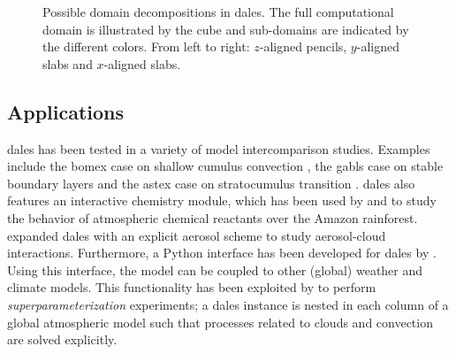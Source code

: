 \begin{figure}[H]
    \centering
    
    \caption{Possible domain decompositions in \acrshort{dales}. The full computational domain is illustrated by the cube and sub-domains are indicated by the different colors. From left to right: $z$-aligned pencils, $y$-aligned slabs and $x$-aligned slabs.}
    \label{fig:dales_domain_decomposition}
\end{figure}

\newpage

\subsection{Applications}
\acrshort{dales} has been tested in a variety of model intercomparison studies. Examples include the \acrshort{bomex} case on shallow cumulus convection \citep{siebesmaLargeEddySimulation2003}, the \acrshort{gabls} case on stable boundary layers \citep{beareIntercomparisonLargeEddySimulations2006} and the \acrshort{astex} case on stratocumulus transition \citep{vanderdussenGASSEUCLIPSEModel2013}. \acrshort{dales} also features an interactive chemistry module, which has been used by \citet{vila-gueraudearellanoRoleBoundaryLayer2011} and \citet{ouwerslootQuantifyingTransportSubcloud2013} to study the behavior of atmospheric chemical reactants over the Amazon rainforest. \citet{debruineExplicitAerosolCloud2019} expanded \acrshort{dales} with an explicit aerosol scheme to study aerosol-cloud interactions. Furthermore, a Python interface has been developed for \acrshort{dales} by \citet{vandenoordPythonInterfaceDutch2020}. Using this interface, the model can be coupled to other (global) weather and climate models. This functionality has been exploited by \citet{janssonRegionalSuperparameterizationGlobal2019} to perform \emph{superparameterization} experiments; a \acrshort{dales} instance is nested in each column of a global atmospheric model such that processes related to clouds and convection are solved explicitly.